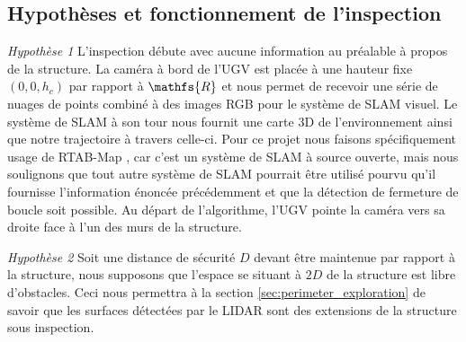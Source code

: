 


\subsection{Hypothèses et fonctionnement de l'inspection}
\label{sec:ugv_hypothesis}

\textit{Hypothèse 1} L'inspection débute avec aucune information au préalable à propos de la structure. La caméra à bord de l'UGV est placée à une hauteur fixe $(0,0,h_c)$ par rapport à $\mathfs{R}$ et nous permet de recevoir une série de nuages de points combiné à des images RGB pour le système de SLAM visuel. Le système de SLAM à son tour nous fournit une carte 3D de l'environnement ainsi que notre trajectoire à travers celle-ci. Pour ce projet nous faisons spécifiquement usage de RTAB-Map \citep{Labbe2014}, car c'est un système de SLAM à source ouverte, mais nous soulignons que tout autre système de SLAM pourrait être utilisé pourvu qu'il fournisse l'information énoncée précédemment et que la détection de fermeture de boucle soit possible. Au départ de l'algorithme, l'UGV pointe la caméra vers sa droite face à l'un des murs de la structure.

\textit{Hypothèse 2} Soit une distance de sécurité $D$ devant être maintenue par rapport à la structure, nous supposons que l'espace se situant à $2D$ de la structure est libre d'obstacles. Ceci nous permettra à la section \ref{sec:perimeter_exploration} de savoir que les surfaces détectées par le LIDAR sont des extensions de la structure sous inspection.

